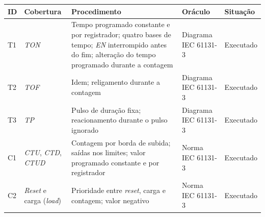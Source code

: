 \begin{quadrofixo}
    \centering
    \small\singlespacing
    \begin{tabular}{|p{0.8cm}|p{3.2cm}|p{4.8cm}|p{2.8cm}|p{2.3cm}|}
        \hline
        ID & Cobertura & Procedimento & Oráculo & Situação \\
        \hline
        T1 & \textit{TON} & Tempo programado constante e por registrador; quatro bases de tempo; \textit{EN} interrompido antes do fim; alteração do tempo programado durante a contagem & Diagrama IEC 61131-3 & Executado \\
        \hline
        T2 & \textit{TOF} & Idem; religamento durante a contagem & Diagrama IEC 61131-3 & Executado \\
        \hline
        T3 & \textit{TP} & Pulso de duração fixa; reacionamento durante o pulso ignorado & Diagrama IEC 61131-3 & Executado \\
        \hline
        C1 & \textit{CTU}, \textit{CTD}, \textit{CTUD} & Contagem por borda de subida; saídas nos limites; valor programado constante e por registrador & Norma IEC 61131-3 & Executado \\
        \hline
        C2 & \textit{Reset} e carga (\textit{load}) & Prioridade entre \textit{reset}, carga e contagem; valor negativo & Norma IEC 61131-3 & Executado \\
        \hline
    \end{tabular}
    \label{qua:testes-temporizacao}
\end{quadrofixo}

